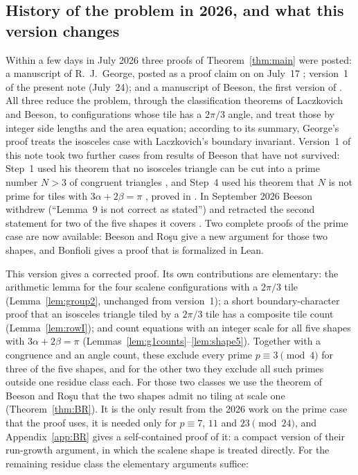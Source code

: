 \documentclass[11pt]{amsart}
\theoremstyle{remark}
\begin{document}
\subsection*{History of the problem in 2026, and what this version changes}
Within a few days in July 2026 three proofs of Theorem~\ref{thm:main} were posted: a manuscript of R.~J.~George, posted as a proof claim on \cite{EP634} on July~17 \cite{George}; version~1 of the present note (July~24); and a manuscript of Beeson, the first version of \cite{BR}. All three reduce the problem, through the classification theorems of Laczkovich and Beeson, to configurations whose tile has a $2\pi/3$ angle, and treat those by integer side lengths and the area equation; according to its summary, George's proof treats the isosceles case with Laczkovich's boundary invariant. Version~1 of this note took two further cases from results of Beeson that have not survived: Step~1 used his theorem that no isosceles triangle can be cut into a prime number $N>3$ of congruent triangles \cite[Theorem~11]{BeesonPrime}, and Step~4 used his theorem that $N$ is not prime for tiles with $3\alpha+2\beta=\pi$ \cite[Theorem~1]{BeesonPrime}, proved in \cite{Beeson2229}. In September 2026 Beeson withdrew \cite{BeesonPrime} (``Lemma~9 is not correct as stated'') and retracted the second statement for two of the five shapes it covers \cite[version~4]{Beeson2229}. Two complete proofs of the prime case are now available: Beeson and Ro\c{s}u \cite{BR} give a new argument for those two shapes, and Bonfioli \cite{Bonfioli1,Bonfioli2} gives a proof that is formalized in Lean.

This version gives a corrected proof. Its own contributions are elementary: the arithmetic lemma for the four scalene configurations with a $2\pi/3$ tile (Lemma~\ref{lem:group2}, unchanged from version~1); a short boundary-character proof that an isosceles triangle tiled by a $2\pi/3$ tile has a composite tile count (Lemma~\ref{lem:rowI}); and count equations with an integer scale for all five shapes with $3\alpha+2\beta=\pi$ (Lemmas~\ref{lem:g1counts}--\ref{lem:shape5}). Together with a congruence and an angle count, these exclude every prime $p\equiv3\pmod4$ for three of the five shapes, and for the other two they exclude all such primes outside one residue class each. For those two classes we use the theorem of Beeson and Ro\c{s}u that the two shapes admit no tiling at scale one (Theorem~\ref{thm:BR}). It is the only result from the 2026 work on the prime case that the proof uses, it is needed only for $p\equiv 7$, $11$ and $23\pmod{24}$, and Appendix~\ref{app:BR} gives a self-contained proof of it: a compact version of their run-growth argument, in which the scalene shape is treated directly. For the remaining residue class the elementary arguments suffice:
\end{document}
